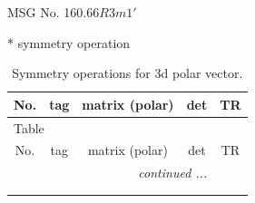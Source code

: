 \documentclass[fleqn,8pt]{jsarticle}
\begin{document}
\setcounter{MaxMatrixCols}{32}

\renewcommand{\tablename}{Table~}
\renewcommand{\figurename}{Figure~}
\begin{center}
\LARGE
MSG No. 160.66\quad$R3m1'$
\end{center}
* symmetry operation
\renewcommand{\arraystretch}{1.3}
\begin{longtable}{ccccc}
\caption{Symmetry operations for 3d polar vector.}
 \\
 \hline \hline
No. & tag & matrix (polar) & det & TR \\ \hline \endfirsthead

\multicolumn{4}{l}{\tablename\ \thetable{}} \\
 \hline \hline
No. & tag & matrix (polar) & det & TR \\ \hline \endhead

 \hline \hline
\multicolumn{4}{r}{\footnotesize\it continued ...} \\ \endfoot

 \hline \hline
\multicolumn{4}{r}{} \\ \endlastfoot


\end{longtable}
\end{document}
